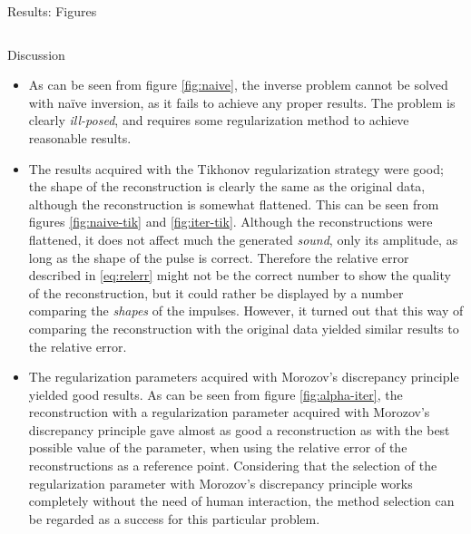 \documentclass[final]{beamer}
\begin{document}
\begin{frame}[t]
\begin{columns}[t]
\begin{column}{.465\textwidth}
\begin{block}{Results: Figures}
\begin{columns}
\end{columns}


\end{block}


\begin{block}{Discussion}

\begin{itemize}

\item As can be seen from figure \ref{fig:naive}, the inverse problem cannot be solved with naïve inversion, as it fails to achieve any proper results. The problem is clearly \emph{ill-posed}, and requires some regularization method to achieve reasonable results.

\item The results acquired with the Tikhonov regularization strategy were good; the shape of the reconstruction is clearly the same as the original data, although the reconstruction is somewhat flattened. This can be seen from figures \ref{fig:naive-tik} and \ref{fig:iter-tik}. Although the reconstructions were flattened, it does not affect much the generated \emph{sound}, only its amplitude, as long as the shape of the pulse is correct. Therefore the relative error described in \eqref{eq:relerr} might not be the correct number to show the quality of the reconstruction, but it could rather be displayed by a number comparing the \emph{shapes} of the impulses. However, it turned out that this way of comparing the reconstruction with the original data yielded similar results to the relative error.

\item The regularization parameters acquired with Morozov's discrepancy principle yielded good results. As can be seen from figure \ref{fig:alpha-iter}, the reconstruction with a regularization parameter acquired with Morozov's discrepancy principle gave almost as good a reconstruction as with the best possible value of the parameter, when using the relative error of the reconstructions as a reference point. Considering that the selection of the regularization parameter with Morozov's discrepancy principle works completely without the need of human interaction, the method selection can be regarded as a success for this particular problem.


\end{itemize}
\end{block}
\end{column}
\end{columns}
\end{frame}
\end{document}
